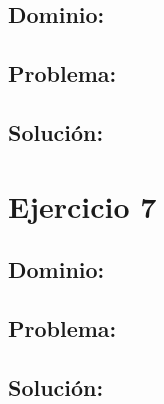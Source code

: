 \documentclass[10pt, spanish]{article}
\begin{document}
\subsection{Dominio:}


\subsection{Problema:}

\subsection{Solución:}







\section{Ejercicio 7}


\subsection{Dominio:}


\subsection{Problema:}

\subsection{Solución:}
\end{document}
